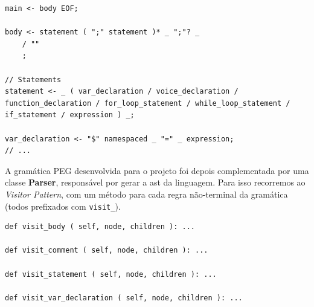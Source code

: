 \begin{lstlisting}[caption={Excerto da gramática desenvolvida}]
main <- body EOF;

body <- statement ( ";" statement )* _ ";"? _
    / ""
    ;

// Statements
statement <- _ ( var_declaration / voice_declaration / function_declaration / for_loop_statement / while_loop_statement / if_statement / expression ) _;

var_declaration <- "$" namespaced _ "=" _ expression;
// ...
\end{lstlisting}

A gramática PEG desenvolvida para o projeto foi depois complementada por uma classe \textbf{Parser}, responsável por gerar a \acrshort{ast} da linguagem. Para isso recorremos ao \textit{Visitor Pattern}, com um método para cada regra não-terminal da gramática (todos prefixados com \texttt{visit\_}).

\begin{lstlisting}[caption={Métodos responsáveis por criarem a AST}]
def visit_body ( self, node, children ): ...

def visit_comment ( self, node, children ): ...

def visit_statement ( self, node, children ): ...

def visit_var_declaration ( self, node, children ): ...
\end{lstlisting}

